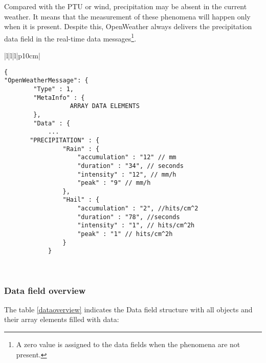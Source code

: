 Compared with the \gls{PTU} or wind, precipitation may be absent in the current weather. It means that the measurement of these phenomena will happen only when it is present. Despite this, OpenWeather always delivers the precipitation data field in the real-time data messages\footnote{A zero value is assigned to the data fields when the phenomena are not present.}.

\begin{table}[H]
\centering
\begin{tabular}{|l|l|l|p{10cm}|}
\hline
\begin{minipage}[t]{\linewidth}
	\begin{verbatim}
{
"OpenWeatherMessage": {
        "Type" : 1,
        "MetaInfo" : {
	              ARRAY DATA ELEMENTS
        },
        "Data" : {
            ...
       "PRECIPITATION" : {
                "Rain" : {
                    "accumulation" : "12" // mm
                    "duration" : "34", // seconds
                    "intensity" : "12", // mm/h
                    "peak" : "9" // mm/h
                },
                "Hail" : {
                    "accumulation" : "2", //hits/cm^2
                    "duration" : "78", //seconds
                    "intensity" : "1", // hits/cm^2h
                    "peak" : "1" // hits/cm^2h
                }
            }
      \end{verbatim}
\end{minipage} \\
\hline
\end{tabular}
\caption{Precipitation data field with real-time in a data message of OpenWeather protocol.}
\end{table}

\subsubsection{Data field overview}

The table \ref{dataoverview} indicates the Data field structure with all objects and their array elements filled with data:

